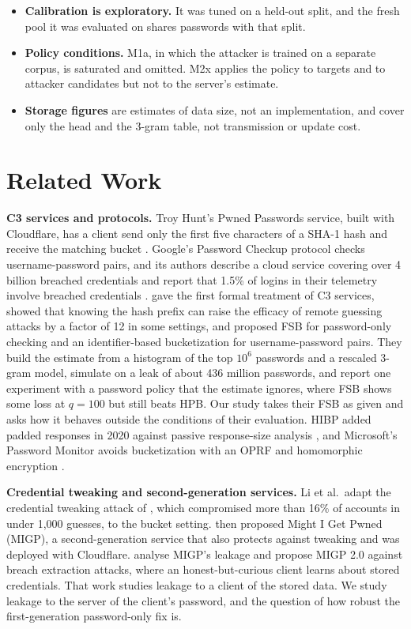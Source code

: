 \begin{itemize}
\item \textbf{Calibration is exploratory.} It was tuned on a held-out split, and the fresh pool it was evaluated on shares passwords with that split.
\item \textbf{Policy conditions.} M1a, in which the attacker is trained on a separate corpus, is saturated and omitted. M2x applies the policy to targets and to attacker candidates but not to the server's estimate.
\item \textbf{Storage figures} are estimates of data size, not an implementation, and cover only the head and the 3-gram table, not transmission or update cost.
\end{itemize}

\section{Related Work}\label{sec:related}

\textbf{C3 services and protocols.} Troy Hunt's Pwned Passwords service, built with Cloudflare, has a client send only the first five characters of a SHA-1 hash and receive the matching bucket \citep{hunt}. Google's Password Checkup protocol checks username-password pairs, and its authors describe a cloud service covering over 4 billion breached credentials and report that 1.5\% of logins in their telemetry involve breached credentials \citep{thomas2019}. \citet{li2019} gave the first formal treatment of C3 services, showed that knowing the hash prefix can raise the efficacy of remote guessing attacks by a factor of 12 in some settings, and proposed FSB for password-only checking and an identifier-based bucketization for username-password pairs. They build the estimate from a histogram of the top $10^6$ passwords and a rescaled 3-gram model, simulate on a leak of about 436 million passwords, and report one experiment with a password policy that the estimate ignores, where FSB shows some loss at $q=100$ but still beats HPB. Our study takes their FSB as given and asks how it behaves outside the conditions of their evaluation. HIBP added padded responses in 2020 against passive response-size analysis \citep{ali2020}, and Microsoft's Password Monitor avoids bucketization with an OPRF and homomorphic encryption \citep{msr}.

\textbf{Credential tweaking and second-generation services.} Li et al.\ adapt the credential tweaking attack of \citet{pal2019}, which compromised more than 16\% of accounts in under 1,000 guesses, to the bucket setting. \citet{pal2022} then proposed Might I Get Pwned (MIGP), a second-generation service that also protects against tweaking and was deployed with Cloudflare. \citet{pasquini2024} analyse MIGP's leakage and propose MIGP 2.0 against breach extraction attacks, where an honest-but-curious client learns about stored credentials. That work studies leakage to a client of the stored data. We study leakage to the server of the client's password, and the question of how robust the first-generation password-only fix is.

